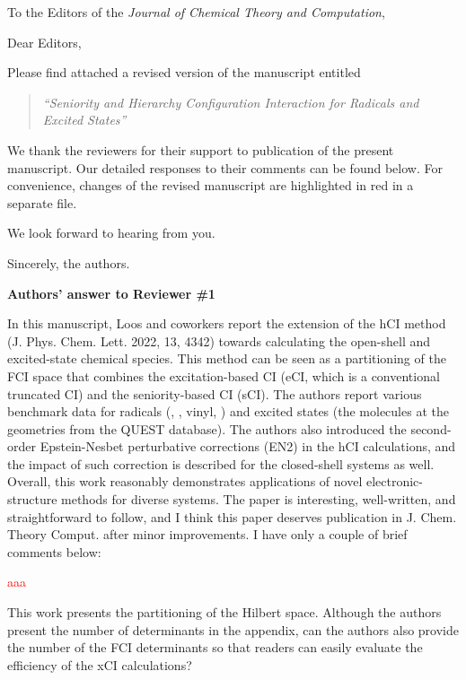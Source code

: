 \documentclass[10pt]{letter}
\newcommand{\alert}[1]{\textcolor{red}{#1}}
\begin{document}
\begin{letter}%
{To the Editors of the \textit{Journal of Chemical Theory and Computation},}

\opening{Dear Editors,}

\justifying
Please find attached a revised version of the manuscript entitled
\begin{quote}
	\textit{``Seniority and Hierarchy Configuration Interaction for Radicals and Excited States''}
\end{quote}

We thank the reviewers for their support to publication of the present manuscript.
Our detailed responses to their comments can be found below.
For convenience, changes of the revised manuscript are highlighted in red in a separate file.

We look forward to hearing from you.

\closing{Sincerely, the authors.}

\newpage

\noindent \textbf{\large Authors' answer to Reviewer \#1}

{In this manuscript, Loos and coworkers report the extension of the hCI method (J. Phys. Chem. Lett. 2022, 13, 4342) towards calculating the open-shell and excited-state chemical species. 
This method can be seen as a partitioning of the FCI space that combines the excitation-based CI (eCI, which is a conventional truncated CI) and the seniority-based CI (sCI).
The authors report various benchmark data for radicals (, , vinyl, ) and excited states (the molecules at the geometries from the QUEST database).
The authors also introduced the second-order Epstein-Nesbet perturbative corrections (EN2) in the hCI calculations,
and the impact of such correction is described for the closed-shell systems as well.
Overall, this work reasonably demonstrates applications of novel electronic-structure methods for diverse systems. 
The paper is interesting, well-written, and straightforward to follow, and I think this paper deserves publication in J. Chem. Theory Comput. after minor improvements. 
I have only a couple of brief comments below:
}

\alert{
	aaa
}


{This work presents the partitioning of the Hilbert space. Although the authors present the number
of determinants in the appendix, can the authors also provide the number of the FCI determinants
so that readers can easily evaluate the efficiency of the xCI calculations?
}


\end{letter}
\end{document}
